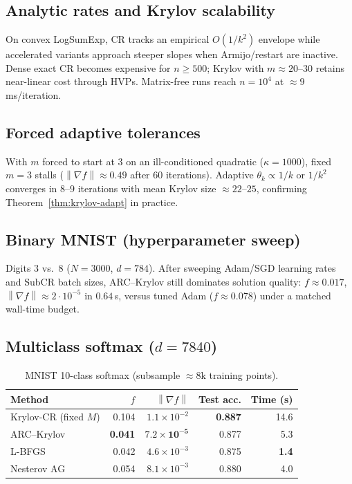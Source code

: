 \documentclass[11pt,a4paper]{article}
\newcommand{\norm}[1]{\left\|#1\right\|}
\newcommand{\grad}{\nabla}
\begin{document}
\subsection{Analytic rates and Krylov scalability}
On convex LogSumExp, CR tracks an empirical $O(1/k^{2})$ envelope while accelerated variants approach steeper slopes when Armijo/restart are inactive.
Dense exact CR becomes expensive for $n\ge 500$; Krylov with $m\approx 20$--$30$ retains near-linear cost through HVPs.
Matrix-free runs reach $n=10^{4}$ at $\approx 9$\,ms/iteration.

\subsection{Forced adaptive tolerances}
With $m$ forced to start at $3$ on an ill-conditioned quadratic ($\kappa=1000$), fixed $m{=}3$ stalls ($\norm{\grad f}\approx 0.49$ after $60$ iterations).
Adaptive $\theta_{k}\propto 1/k$ or $1/k^{2}$ converges in $8$--$9$ iterations with mean Krylov size $\approx 22$--$25$, confirming Theorem~\ref{thm:krylov-adapt} in practice.

\subsection{Binary MNIST (hyperparameter sweep)}
Digits $3$ vs.\ $8$ ($N{=}3000$, $d{=}784$).
After sweeping Adam/SGD learning rates and SubCR batch sizes, ARC--Krylov still dominates solution quality:
$f\approx 0.017$, $\norm{\grad f}\approx 2\cdot 10^{-5}$ in $0.64$\,s, versus tuned Adam ($f\approx 0.078$) under a matched wall-time budget.

\subsection{Multiclass softmax ($d=7840$)}
\begin{table}[t]
\centering
\caption{MNIST 10-class softmax (subsample $\approx 8$k training points).}
\label{tab:softmax}
\begin{tabular}{lrrrr}
\toprule
Method & $f$ & $\norm{\grad f}$ & Test acc. & Time (s) \\
\midrule
Krylov-CR (fixed $M$) & 0.104 & $1.1{\times}10^{-2}$ & \textbf{0.887} & 14.6 \\
ARC--Krylov & \textbf{0.041} & $\mathbf{7.2{\times}10^{-5}}$ & 0.877 & 5.3 \\
L-BFGS & 0.042 & $4.6{\times}10^{-3}$ & 0.875 & \textbf{1.4} \\
Nesterov AG & 0.054 & $8.1{\times}10^{-3}$ & 0.880 & 4.0 \\
\bottomrule
\end{tabular}
\end{table}
\end{document}

